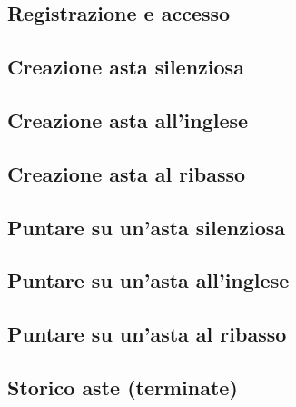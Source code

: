 { 	%
	\subsection*{Registrazione e accesso}
	
	\newpage

	\subsection*{Creazione asta silenziosa}
	
	\newpage

	\subsection*{Creazione asta all'inglese}
	
	\newpage

	\subsection*{Creazione asta al ribasso}
	
	\newpage

	\subsection*{Puntare su un'asta silenziosa}
	
	\newpage

	\subsection*{Puntare su un'asta all'inglese}
	
	\newpage

	\subsection*{Puntare su un'asta al ribasso}
	
	\newpage

	\subsection*{Storico aste (terminate)}
	
	\newpage

}
